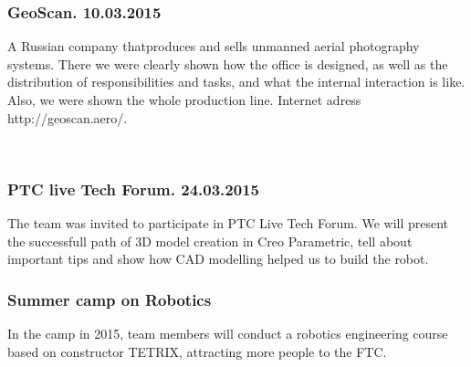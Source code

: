    \subsubsection{GeoScan. 10.03.2015}
	A Russian company thatproduces and sells unmanned aerial photography systems. There we were clearly shown how the office is designed, as well as the distribution of responsibilities and tasks, and what the internal interaction is like. Also, we were shown the whole production line. Internet adress http://geoscan.aero/.
    \begin{figure}[H]
    	\\	
    \end{figure}
	\subsubsection{PTC live Tech Forum. 24.03.2015}
	 The team was invited to participate in PTC Live Tech Forum. We will present the successfull path of 3D model creation in Creo Parametric, tell about important tips and show how CAD modelling helped us to build the robot.
	
	\subsubsection{Summer camp on Robotics}
	In the camp in 2015, team members will conduct a robotics engineering course based on constructor TETRIX, attracting more people to the FTC.
	
	\fillpage
		
		
		
		
		
		
		
		
		